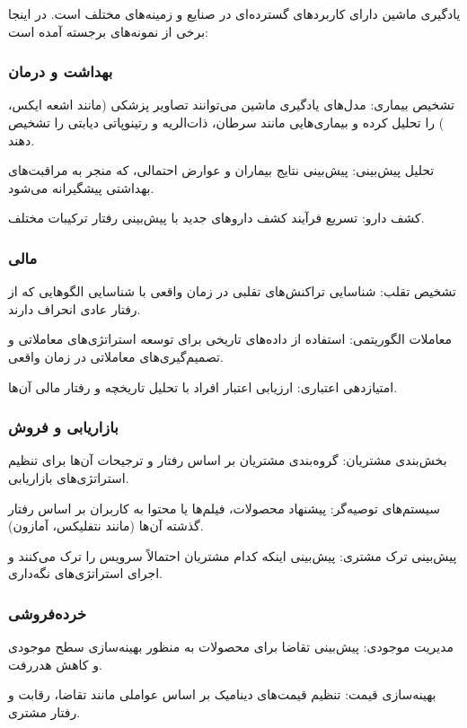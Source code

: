 \documentclass[a4paper, titlepage]{article}
\begin{document}
یادگیری ماشین دارای کاربردهای گسترده‌ای در صنایع و زمینه‌های مختلف است. در اینجا برخی از نمونه‌های برجسته آمده است:

\subsubsection{بهداشت و درمان}

تشخیص بیماری: مدل‌های یادگیری ماشین می‌توانند تصاویر پزشکی (مانند اشعه ایکس، ) را تحلیل کرده و بیماری‌هایی مانند سرطان، ذات‌الریه و رتینوپاتی دیابتی را تشخیص دهند.

تحلیل پیش‌بینی: پیش‌بینی نتایج بیماران و عوارض احتمالی، که منجر به مراقبت‌های بهداشتی پیشگیرانه می‌شود.

کشف دارو: تسریع فرآیند کشف داروهای جدید با پیش‌بینی رفتار ترکیبات مختلف.

\subsubsection{مالی}

تشخیص تقلب: شناسایی تراکنش‌های تقلبی در زمان واقعی با شناسایی الگوهایی که از رفتار عادی انحراف دارند.

معاملات الگوریتمی: استفاده از داده‌های تاریخی برای توسعه استراتژی‌های معاملاتی و تصمیم‌گیری‌های معاملاتی در زمان واقعی.

امتیازدهی اعتباری: ارزیابی اعتبار افراد با تحلیل تاریخچه و رفتار مالی آن‌ها.

\subsubsection{بازاریابی و فروش}

بخش‌بندی مشتریان: گروه‌بندی مشتریان بر اساس رفتار و ترجیحات آن‌ها برای تنظیم استراتژی‌های بازاریابی.

سیستم‌های توصیه‌گر: پیشنهاد محصولات، فیلم‌ها یا محتوا به کاربران بر اساس رفتار گذشته آن‌ها (مانند نتفلیکس، آمازون).

پیش‌بینی ترک مشتری: پیش‌بینی اینکه کدام مشتریان احتمالاً سرویس را ترک می‌کنند و اجرای استراتژی‌های نگه‌داری.

\subsubsection{خرده‌فروشی}

مدیریت موجودی: پیش‌بینی تقاضا برای محصولات به منظور بهینه‌سازی سطح موجودی و کاهش هدررفت.

بهینه‌سازی قیمت: تنظیم قیمت‌های دینامیک بر اساس عواملی مانند تقاضا، رقابت و رفتار مشتری.
\end{document}
